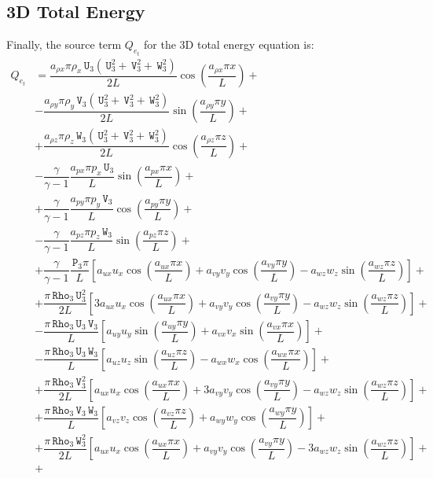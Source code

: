 \documentclass[10pt]{article}
\newcommand{\Rho}{\,\mathtt{Rho}}
\newcommand{\PP}{\,\mathtt{P}}
\newcommand{\U}{\,\mathtt{U}}
\newcommand{\V}{\,\mathtt{V}}
\newcommand{\W}{\,\mathtt{W}}
\begin{document}
\subsection{3D Total Energy}

Finally, the source term $Q_{e_t}$ for the 3D total energy equation is:
\begin{equation}
 \begin{split}\label{eq:ns_3d_e}
Q_{e_t} &= \dfrac{a_{\rho x} \pi \rho_x \U_3 (\U_3^2+\V_3^2+\W_3^2)}{2L}\cos\left(\dfrac{a_{\rho x} \pi x}{L}\right)+\\
&- \dfrac{a_{\rho y} \pi \rho_y \V_3 (\U_3^2+\V_3^2+\W_3^2)}{2L}\sin\left(\dfrac{a_{\rho y} \pi y}{L}\right)+\\
&+  \dfrac{a_{\rho z} \pi \rho_z \W_3 (\U_3^2+\V_3^2+\W_3^2)}{2L}\cos\left(\dfrac{a_{\rho z} \pi z}{L}\right)+\\
&-\dfrac{\gamma}{\gamma-1}\dfrac{a_{px} \pi p_x  \U_3}{L}\sin\left(\dfrac{a_{px} \pi x}{L}\right) +\\
&+\dfrac{\gamma}{\gamma-1}\dfrac{a_{py} \pi p_y \V_3}{L}\cos\left(\dfrac{a_{py} \pi y}{L}\right) +\\
&-\dfrac{\gamma}{\gamma-1}\dfrac{a_{pz}\pi  p_z  \W_3}{L}\sin\left(\dfrac{a_{pz} \pi z}{L}\right) +\\
&+ \dfrac{\gamma}{\gamma-1}\dfrac{\PP_3 \pi}{L}\left[a_{ux} u_x \cos\left(\dfrac{a_{ux} \pi x}{L}\right)+a_{vy} v_y \cos\left(\dfrac{a_{vy} \pi y}{L}\right)-a_{wz} w_z \sin\left(\dfrac{a_{wz} \pi z}{L}\right)\right] +\\
&+\dfrac{\pi \Rho_3 \U_3^2}{2L}\left[3 a_{ux} u_x \cos\left(\dfrac{a_{ux} \pi x}{L}\right)+a_{vy} v_y \cos\left(\dfrac{a_{vy} \pi y}{L}\right)-a_{wz} w_z \sin\left(\dfrac{a_{wz} \pi z}{L}\right)\right]+\\
&-\dfrac{\pi \Rho_3 \U_3 \V_3}{L}\left[a_{uy} u_y \sin\left(\dfrac{a_{uy} \pi y}{L}\right)+a_{vx} v_x \sin\left(\dfrac{a_{vx} \pi x}{L}\right)\right] +\\
&-\dfrac{\pi \Rho_3 \U_3 \W_3}{L}\left[a_{uz} u_z \sin\left(\dfrac{a_{uz} \pi z}{L}\right)-a_{wx} w_x \cos\left(\dfrac{a_{wx} \pi x}{L}\right)\right] +\\
&+\dfrac{\pi \Rho_3 \V_3^2}{2L}\left[a_{ux} u_x \cos\left(\dfrac{a_{ux} \pi x}{L}\right)+3 a_{vy} v_y \cos\left(\dfrac{a_{vy} \pi y}{L}\right)-a_{wz} w_z \sin\left(\dfrac{a_{wz} \pi z}{L}\right)\right] +\\
&+ \dfrac{\pi \Rho_3 \V_3 \W_3}{L}\left[a_{vz} v_z \cos\left(\dfrac{a_{vz} \pi z}{L}\right)+a_{wy} w_y \cos\left(\dfrac{a_{wy} \pi y}{L}\right)\right]+\\
&+\dfrac{\pi \Rho_3 \W_3^2}{2L}\left[a_{ux} u_x \cos\left(\dfrac{a_{ux} \pi x}{L}\right)+a_{vy} v_y \cos\left(\dfrac{a_{vy} \pi y}{L}\right)-3 a_{wz} w_z \sin\left(\dfrac{a_{wz} \pi z}{L}\right)\right]+\\
&+
 \end{split}
\end{equation}
\end{document}
